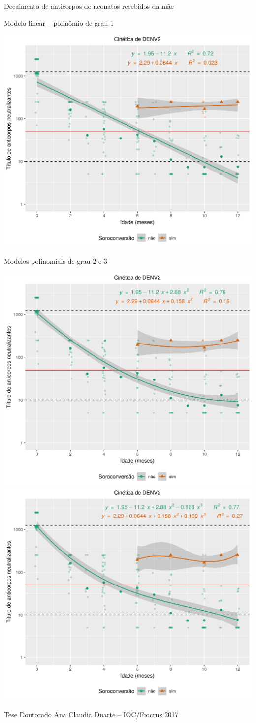 \documentclass{beamer}
\begin{document}
\begin{frame}{\scriptsize Decaimento de anticorpos de neonatos recebidos da mãe}
  \begin{block}{\scriptsize Modelo linear -- polinômio de grau 1}
    \begin{center}
      \includegraphics[width=.3\textwidth]{Cap18-19/cinetica-dengue2-poly1}
    \end{center}
  \end{block}
  \begin{block}{\scriptsize Modelos polinomiais de grau 2 e 3}
    \begin{center}
      \includegraphics[width=.3\textwidth]{Cap18-19/cinetica-dengue2-poly2}
      \includegraphics[width=.3\textwidth]{Cap18-19/cinetica-dengue2-poly3}
    \end{center}
  \end{block}
  {\hfill \scriptsize Tese Doutorado Ana Claudia Duarte -- IOC/Fiocruz 2017}
\end{frame}
\end{document}
